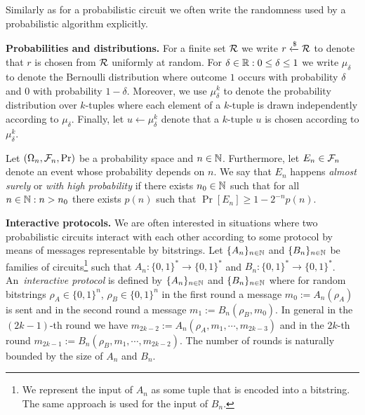 Similarly as for a probabilistic circuit we often write the randomness used by a probabilistic algorithm explicitly.


\textbf{Probabilities and distributions.}
For a finite set $\mathcal{R}$ we write $r \xleftarrow{\$} \mathcal{R}$ to denote that $r$ is chosen from $\mathcal{R}$ uniformly at random.
For $\delta \in \mathbb{R} : 0 \leq \delta \leq 1$ we write $\mu_{\delta}$ to denote the Bernoulli distribution where outcome $1$ occurs with
probability $\delta$ and $0$ with probability $1-\delta$.
Moreover, we use $\mu_{\delta}^k$ to denote the probability distribution over $k$-tuples
where each element of a $k$-tuple is drawn independently according to $\mu_{\delta}$.
Finally, let $u \leftarrow \mu_{\delta}^k$ denote that a $k$-tuple $u$ is chosen according to $\mu_{\delta}^k$.


Let $(\Omega_n, \mathcal{F}_n, \Pr)$ be a probability space and $n \in \mathbb{N}$.
Furthermore, let $E_n \in \mathcal{F}_n$ denote an event whose probability depends on $n$.
We say that $E_n$ happens \textit{almost surely} or \textit{with high probability} if
there exists $n_0 \in \mathbb{N}$ such that for all $n \in \mathbb{N} : n > n_0$ there exists $p(n)$ such that $\Pr[E_n] \geq 1 - 2^{-n} \mathit{p}(n)$.

\textbf{Interactive protocols.}
We are often interested in situations where two probabilistic circuits interact with
each other according to some protocol by means of messages representable by bitstrings.
Let $\{A_n\}_{n \in \mathbb{N}}$ and $\{B_n\}_{n \in \mathbb{N}}$ be families of circuits\footnote{We represent the input of $A_n$ as some tuple that is encoded into a bitstring.
The same approach is used for the input of $B_n$.}
such that $A_n : \{0,1\}^{*} \rightarrow \{0,1\}^{*}$ and $B_n : \{0,1\}^{*} \rightarrow \{0,1\}^{*}$.
An~\textit{interactive protocol} is defined by $\{A_n\}_{n \in \mathbb{N}}$ and $\{B_n\}_{n \in \mathbb{N}}$ where
for random bitstrings $\rho_A \in \{0,1\}^{n}$, $\rho_B \in \{0,1\}^{n}$ in the first round a message $m_0 := A_n(\rho_A)$ is sent and in the second round a message $m_1 := B_n(\rho_B, m_0)$.
In general in the $(2k\!-\!1)$-th round we have $m_{2k-2} := A_n(\rho_A, m_1, \cdots, m_{2k-3})$ and in the $2k$-th round $m_{2k-1} := B_n(\rho_B, m_1, \cdots, m_{2k-2})$.
The number of rounds is naturally bounded by the size of $A_n$ and $B_n$.

